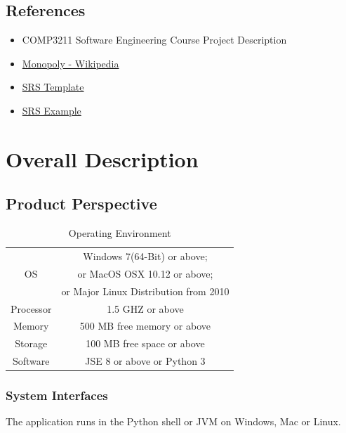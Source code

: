   \section{References}
    \begin{itemize}
      \item COMP3211 Software Engineering Course Project Description
      \item \href{https://en.wikipedia.org/wiki/Monopoly_(game)}{Monopoly - Wikipedia}
      \item \href{https://www.overleaf.com/latex/templates/cse355-software-requirements-specification-layout/pvjpzxthtngc}{SRS Template}
      \item \href{https://www.reqview.com/papers/ReqView-Example_Software_Requirements_Specification_SRS_Document.pdf}{SRS Example}
    \end{itemize}

\chapter{Overall Description}
\label{ch:overall-desc}

  \section{Product Perspective}
    \begin{table}[!htbp]
      \centering
      \begin{tabular}{c|c}
        \toprule
        \multirow{3}{*}{OS} & Windows 7(64-Bit) or above;  \\
        & or MacOS OSX 10.12 or above; \\
        & or Major Linux Distribution from 2010 \\
        \midrule
        Processor & 1.5 GHZ or above \\
        \midrule
        Memory & 500 MB free memory or above \\
        \midrule
        Storage & 100 MB free space or above \\
        \midrule
        Software & JSE 8 or above or Python 3 \\
        \bottomrule
      \end{tabular}
      \caption{Operating Environment}
      \label{table:opr-env}
    \end{table}
    
    \subsection{System Interfaces}
      The application runs in the Python shell or JVM on Windows, Mac or Linux.

